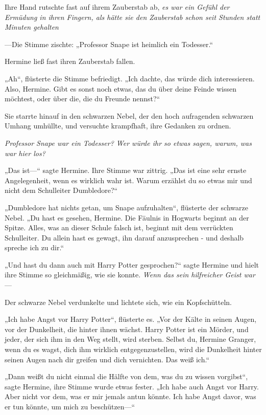 {Ihre Hand rutschte fast auf ihrem Zauberstab ab, \emph{es war ein Gefühl der Ermüdung in ihren Fingern, als hätte sie den Zauberstab schon seit Stunden statt Minuten gehalten}

—Die Stimme zischte: „Professor Snape ist heimlich ein Todesser.“

Hermine ließ fast ihren Zauberstab fallen.

„Ah“, flüsterte die Stimme befriedigt. „Ich dachte, das würde dich interessieren. Also, Hermine. Gibt es sonst noch etwas, das du über deine Feinde wissen möchtest, oder über die, die du Freunde nennst?“

Sie starrte hinauf in den schwarzen Nebel, der den hoch aufragenden schwarzen Umhang umhüllte, und versuchte krampfhaft, ihre Gedanken zu ordnen.

\emph{Professor Snape war ein Todesser? Wer würde ihr so etwas sagen, warum, was war hier los?}

„Das ist—“ sagte Hermine. Ihre Stimme war zittrig. „Das ist eine sehr ernste Angelegenheit, wenn es wirklich wahr ist. Warum erzählst du so etwas mir und nicht dem Schulleiter Dumbledore?“

„Dumbledore hat nichts getan, um Snape aufzuhalten“, flüsterte der schwarze Nebel. „Du hast es gesehen, Hermine. Die Fäulnis in Hogwarts beginnt an der Spitze. Alles, was an dieser Schule falsch ist, beginnt mit dem verrückten Schulleiter. Du allein hast es gewagt, ihn darauf anzusprechen - und deshalb spreche ich zu dir.“

„Und hast du dann auch mit Harry Potter gesprochen?“ sagte Hermine und hielt ihre Stimme so gleichmäßig, wie sie konnte. \emph{Wenn das sein hilfreicher Geist war}—

Der schwarze Nebel verdunkelte und lichtete sich, wie ein Kopfschütteln.

„Ich habe Angst vor Harry Potter“, flüsterte es. „Vor der Kälte in seinen Augen, vor der Dunkelheit, die hinter ihnen wächst. Harry Potter ist ein Mörder, und jeder, der sich ihm in den Weg stellt, wird sterben. Selbst du, Hermine Granger, wenn du es wagst, dich ihm wirklich entgegenzustellen, wird die Dunkelheit hinter seinen Augen nach dir greifen und dich vernichten. Das weiß ich.“

„Dann weißt du nicht einmal die Hälfte von dem, was du zu wissen vorgibst“, sagte Hermine, ihre Stimme wurde etwas fester. „Ich habe auch Angst vor Harry. Aber nicht vor dem, was er mir jemals antun könnte. Ich habe Angst davor, was er tun könnte, um mich zu beschützen—“

}
